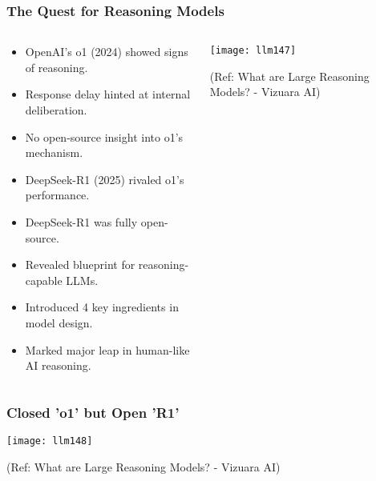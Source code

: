 \begin{frame}[fragile]\frametitle{The Quest for Reasoning Models}

\begin{columns}
    \begin{column}[T]{0.5\linewidth}
		\begin{itemize}
		  \item OpenAI’s o1 (2024) showed signs of reasoning.
		  \item Response delay hinted at internal deliberation.
		  \item No open-source insight into o1’s mechanism.
		  \item DeepSeek-R1 (2025) rivaled o1’s performance.
		  \item DeepSeek-R1 was fully open-source.
		  \item Revealed blueprint for reasoning-capable LLMs.
		  \item Introduced 4 key ingredients in model design.
		  \item Marked major leap in human-like AI reasoning.
		\end{itemize}

    \end{column}
    \begin{column}[T]{0.5\linewidth}
		\begin{center}
		\texttt{[image: llm147]}
		
		{\tiny (Ref: What are Large Reasoning Models? - Vizuara AI)}
		
		\end{center}
    \end{column}
  \end{columns}

\end{frame}

\begin{frame}[fragile]\frametitle{Closed 'o1' but Open 'R1'}


		\begin{center}
		\texttt{[image: llm148]}
		
		{\tiny (Ref: What are Large Reasoning Models? - Vizuara AI)}
		
		\end{center}


\end{frame}

